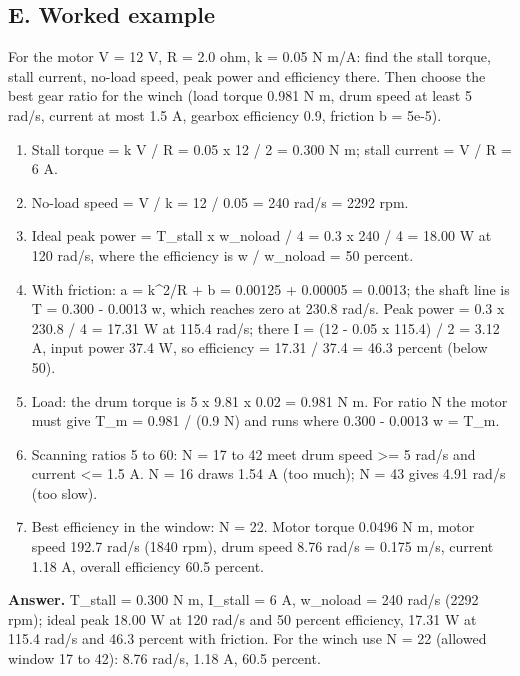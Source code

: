 \documentclass[11pt,a4paper]{article}
\begin{document}
\subsection*{E. Worked example}
For the motor V = 12 V, R = 2.0 ohm, k = 0.05 N m/A: find the stall torque, stall current, no-load speed, peak power and efficiency there. Then choose the best gear ratio for the winch (load torque 0.981 N m, drum speed at least 5 rad/s, current at most 1.5 A, gearbox efficiency 0.9, friction b = 5e-5).
\begin{enumerate}[nosep]
\item Stall torque = k V / R = 0.05 x 12 / 2 = 0.300 N m; stall current = V / R = 6 A.
\item No-load speed = V / k = 12 / 0.05 = 240 rad/s = 2292 rpm.
\item Ideal peak power = T\_stall x w\_noload / 4 = 0.3 x 240 / 4 = 18.00 W at 120 rad/s, where the efficiency is w / w\_noload = 50 percent.
\item With friction: a = k\textasciicircum{}2/R + b = 0.00125 + 0.00005 = 0.0013; the shaft line is T = 0.300 - 0.0013 w, which reaches zero at 230.8 rad/s. Peak power = 0.3 x 230.8 / 4 = 17.31 W at 115.4 rad/s; there I = (12 - 0.05 x 115.4) / 2 = 3.12 A, input power 37.4 W, so efficiency = 17.31 / 37.4 = 46.3 percent (below 50).
\item Load: the drum torque is 5 x 9.81 x 0.02 = 0.981 N m. For ratio N the motor must give T\_m = 0.981 / (0.9 N) and runs where 0.300 - 0.0013 w = T\_m.
\item Scanning ratios 5 to 60: N = 17 to 42 meet drum speed \textgreater{}= 5 rad/s and current \textless{}= 1.5 A. N = 16 draws 1.54 A (too much); N = 43 gives 4.91 rad/s (too slow).
\item Best efficiency in the window: N = 22. Motor torque 0.0496 N m, motor speed 192.7 rad/s (1840 rpm), drum speed 8.76 rad/s = 0.175 m/s, current 1.18 A, overall efficiency 60.5 percent.
\end{enumerate}
\textbf{Answer.} T\_stall = 0.300 N m, I\_stall = 6 A, w\_noload = 240 rad/s (2292 rpm); ideal peak 18.00 W at 120 rad/s and 50 percent efficiency, 17.31 W at 115.4 rad/s and 46.3 percent with friction. For the winch use N = 22 (allowed window 17 to 42): 8.76 rad/s, 1.18 A, 60.5 percent.
\end{document}
